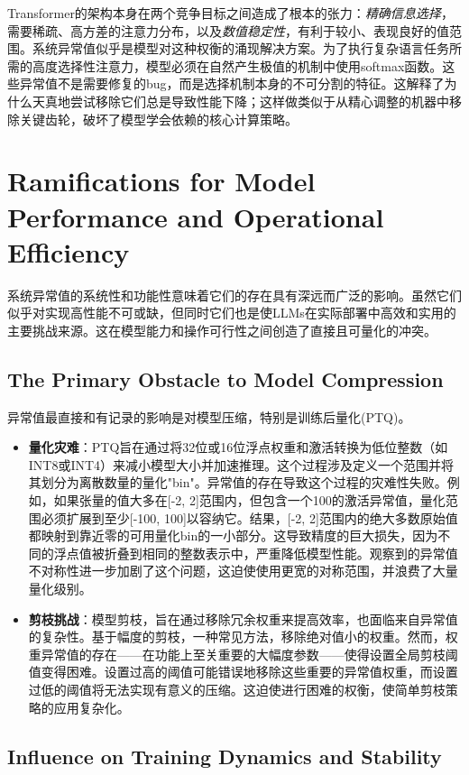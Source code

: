 \documentclass{article}
\begin{document}
Transformer的架构本身在两个竞争目标之间造成了根本的张力：\emph{精确信息选择}，需要稀疏、高方差的注意力分布，以及\emph{数值稳定性}，有利于较小、表现良好的值范围。系统异常值似乎是模型对这种权衡的涌现解决方案。为了执行复杂语言任务所需的高度选择性注意力，模型必须在自然产生极值的机制中使用softmax函数。这些异常值不是需要修复的bug，而是选择机制本身的不可分割的特征。这解释了为什么天真地尝试移除它们总是导致性能下降；这样做类似于从精心调整的机器中移除关键齿轮，破坏了模型学会依赖的核心计算策略。

\section{Ramifications for Model Performance and Operational Efficiency}

系统异常值的系统性和功能性意味着它们的存在具有深远而广泛的影响。虽然它们似乎对实现高性能不可或缺，但同时它们也是使LLMs在实际部署中高效和实用的主要挑战来源。这在模型能力和操作可行性之间创造了直接且可量化的冲突。

\subsection{The Primary Obstacle to Model Compression}

异常值最直接和有记录的影响是对模型压缩，特别是训练后量化(PTQ)。
  
  \begin{itemize}
  \item \textbf{量化灾难}：PTQ旨在通过将32位或16位浮点权重和激活转换为低位整数（如INT8或INT4）来减小模型大小并加速推理。这个过程涉及定义一个范围并将其划分为离散数量的量化"bin"。异常值的存在导致这个过程的灾难性失败。例如，如果张量的值大多在[-2, 2]范围内，但包含一个100的激活异常值，量化范围必须扩展到至少[-100, 100]以容纳它。结果，[-2, 2]范围内的绝大多数原始值都映射到靠近零的可用量化bin的一小部分。这导致精度的巨大损失，因为不同的浮点值被折叠到相同的整数表示中，严重降低模型性能。观察到的异常值不对称性进一步加剧了这个问题，这迫使使用更宽的对称范围，并浪费了大量量化级别。
  \item \textbf{剪枝挑战}：模型剪枝，旨在通过移除冗余权重来提高效率，也面临来自异常值的复杂性。基于幅度的剪枝，一种常见方法，移除绝对值小的权重。然而，权重异常值的存在——在功能上至关重要的大幅度参数——使得设置全局剪枝阈值变得困难。设置过高的阈值可能错误地移除这些重要的异常值权重，而设置过低的阈值将无法实现有意义的压缩。这迫使进行困难的权衡，使简单剪枝策略的应用复杂化。
  \end{itemize}

\subsection{Influence on Training Dynamics and Stability}
\end{document}
